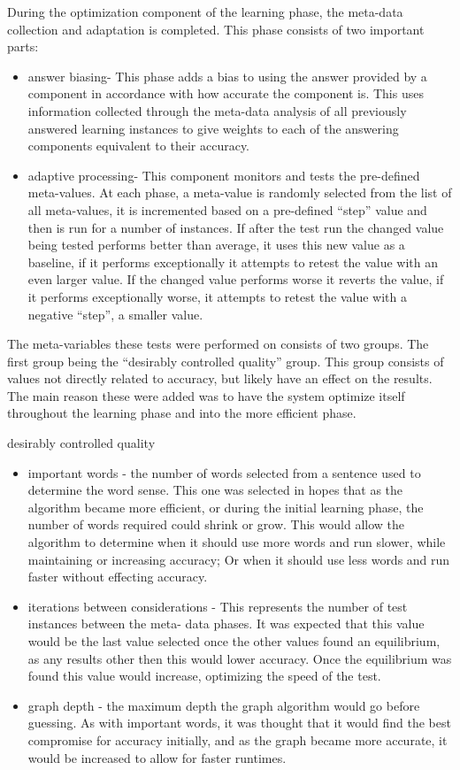 During the optimization component of the learning phase, the meta-data
collection and adaptation is completed.  This phase consists of two important
parts: \begin{itemize}     \item answer biasing- This phase adds a bias to using
the answer provided by a component in accordance with how accurate the component
is.  This uses information collected through the meta-data analysis of all
previously answered learning instances to give weights to each of the answering
components equivalent to their accuracy.     \item adaptive processing- This
component monitors and tests the pre-defined meta-values.  At each phase, a
meta-value is randomly selected from the list of all meta-values, it is
incremented based on a pre-defined ``step'' value and then is run for a number
of instances.  If after the test run the changed value being tested performs
better than average, it uses this new value as a baseline, if it performs
exceptionally it attempts to retest the value with an even larger value.  If the
changed value performs worse it reverts the value, if it performs exceptionally
worse, it attempts to retest the value with a negative ``step'', a smaller
value. \end{itemize}

The meta-variables these tests were performed on consists of two groups. The
first group being the ``desirably controlled quality'' group.  This group
consists of values not directly related to accuracy, but likely have an effect
on the results.  The main reason these were added was to have the system
optimize itself throughout the learning phase and into the more efficient phase.

desirably controlled quality \begin{itemize}     \item important words - the
number of words selected from a sentence used to determine the word sense. This
one was selected in hopes that as the algorithm became more efficient, or during
the initial learning phase, the number of words required could shrink or grow.
This would allow the algorithm to determine when it should use more words and
run slower, while maintaining or increasing accuracy; Or when it should use less
words and run faster without effecting accuracy.     \item iterations between
considerations - This represents the number of test instances between the meta-
data phases. It was expected that this value would be the last value selected
once the other values found an equilibrium, as any results other then this would
lower accuracy. Once the equilibrium was found this value would increase,
optimizing the speed of the test.     \item graph depth - the maximum depth the
graph algorithm would go before guessing.  As with important words, it was
thought that it would find the best compromise for accuracy initially, and as
the graph became more accurate, it would be increased to allow for faster
runtimes. \end{itemize}

